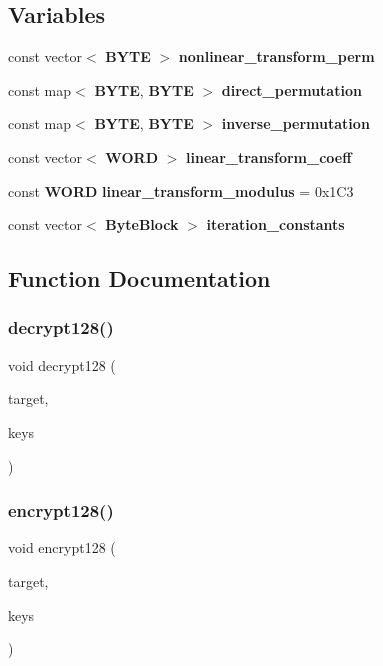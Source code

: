 \subsection*{Variables}
\begin{DoxyCompactItemize}
\item 
const vector$<$ \textbf{ B\+Y\+TE} $>$ \textbf{ nonlinear\+\_\+transform\+\_\+perm}
\item 
const map$<$ \textbf{ B\+Y\+TE}, \textbf{ B\+Y\+TE} $>$ \textbf{ direct\+\_\+permutation}
\item 
const map$<$ \textbf{ B\+Y\+TE}, \textbf{ B\+Y\+TE} $>$ \textbf{ inverse\+\_\+permutation}
\item 
const vector$<$ \textbf{ W\+O\+RD} $>$ \textbf{ linear\+\_\+transform\+\_\+coeff}
\item 
const \textbf{ W\+O\+RD} \textbf{ linear\+\_\+transform\+\_\+modulus} = 0x1\+C3
\item 
const vector$<$ \textbf{ Byte\+Block} $>$ \textbf{ iteration\+\_\+constants}
\end{DoxyCompactItemize}


\subsection{Function Documentation}
\mbox{\label{_kuznyechik_8cpp_ad876925ef59346c079add2d3f3da6d48}} 
\subsubsection{decrypt128()}
{\footnotesize\ttfamily void decrypt128 (\begin{DoxyParamCaption}\item[{\textbf{ B\+Y\+TE} $\ast$}]{target,  }\item[{const vector$<$ \textbf{ Byte\+Block} $>$ \&}]{keys }\end{DoxyParamCaption})}

\mbox{\label{_kuznyechik_8cpp_a5622f3f613174df8fc9d72c540372c46}} 
\subsubsection{encrypt128()}
{\footnotesize\ttfamily void encrypt128 (\begin{DoxyParamCaption}\item[{\textbf{ B\+Y\+TE} $\ast$}]{target,  }\item[{const vector$<$ \textbf{ Byte\+Block} $>$ \&}]{keys }\end{DoxyParamCaption})}

